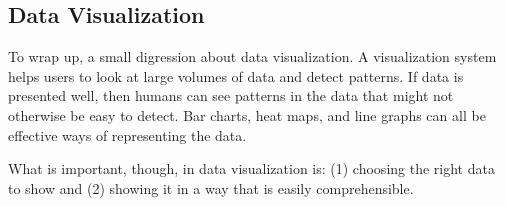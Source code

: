 \subsection*{Data Visualization}

To wrap up, a small digression about data visualization. A visualization system helps users to look at large volumes of data and detect patterns. If data is presented well, then humans can see patterns in the data that might not otherwise be easy to detect. Bar charts, heat maps, and line graphs can all be effective ways of representing the data.

What is important, though, in data visualization is: (1) choosing the right data to show and (2) showing it in a way that is easily comprehensible. 





